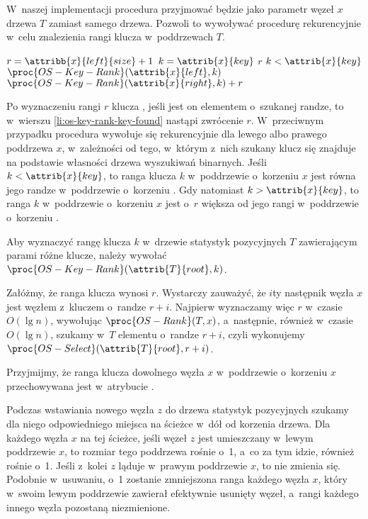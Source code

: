 \exercise %
W~naszej implementacji procedura przyjmować będzie jako parametr węzeł $x$ drzewa $T$ zamiast samego drzewa.
Pozwoli to wywoływać procedurę rekurencyjnie w~celu znalezienia rangi klucza w~poddrzewach $T$.
\begin{codebox}
\li	$r=\attribb{x}{left}{size}+1$
\li	\If $k=\attrib{x}{key}$
\li		\Then \Return $r$ \label{li:os-key-rank-key-found}
		\End
\li	\If $k<\attrib{x}{key}$
\li		\Then \Return $\proc{OS-Key-Rank}(\attrib{x}{left},k)$
\li		\Else \Return $\proc{OS-Key-Rank}(\attrib{x}{right},k)+r$
		\End
\end{codebox}
Po wyznaczeniu rangi $r$ klucza , jeśli jest on elementem o~szukanej randze, to w~wierszu \ref{li:os-key-rank-key-found} nastąpi zwrócenie $r$.
W~przeciwnym przypadku procedura wywołuje się rekurencyjnie dla lewego albo prawego poddrzewa $x$, w~zależności od tego, w~którym z~nich szukany klucz się znajduje na podstawie własności drzewa wyszukiwań binarnych.
Jeśli $k<\attrib{x}{key}$, to ranga klucza $k$ w~poddrzewie o~korzeniu $x$ jest równa jego randze w~poddrzewie o~korzeniu .
Gdy natomiast $k>\attrib{x}{key}$, to ranga $k$ w~poddrzewie o~korzeniu $x$ jest o~$r$ większa od jego rangi w~poddrzewie o~korzeniu .

Aby wyznaczyć rangę klucza $k$ w~drzewie statystyk pozycyjnych $T$ zawierającym parami różne klucze, należy wywołać $\proc{OS-Key-Rank}(\attrib{T}{root},k)$.

\exercise %
Załóżmy, że ranga klucza  wynosi $r$.
Wystarczy zauważyć, że $i$\nbhyphen ty następnik węzła $x$ jest węzłem z~kluczem o~randze $r+i$.
Najpierw wyznaczamy więc $r$ w~czasie $O(\lg n)$, wywołując $\proc{OS-Rank}(T,x)$, a~następnie, również w~czasie $O(\lg n)$, szukamy w~$T$ elementu o~randze $r+i$, czyli wykonujemy $\proc{OS-Select}(\attrib{T}{root},r+i)$.

\exercise %
Przyjmijmy, że ranga klucza dowolnego węzła $x$ w~poddrzewie o~korzeniu $x$ przechowywana jest w~atrybucie .

Podczas wstawiania nowego węzła $z$ do drzewa statystyk pozycyjnych szukamy dla niego odpowiedniego miejsca na ścieżce w~dół od korzenia drzewa.
Dla każdego węzła $x$ na tej ścieżce, jeśli węzeł $z$ jest umieszczany w~lewym poddrzewie $x$, to rozmiar tego poddrzewa rośnie o~1, a~co za tym idzie, również  rośnie o~1.
Jeśli z~kolei $z$ ląduje w~prawym poddrzewie $x$, to  nie zmienia się.
Podobnie w~usuwaniu, o~1 zostanie zmniejszona ranga każdego węzła $x$, który w~swoim lewym poddrzewie zawierał efektywnie usunięty węzeł, a~rangi każdego innego węzła pozostaną niezmienione.

